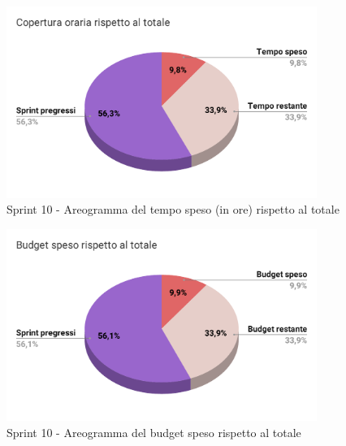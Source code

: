   \begin{figure}[H]
    \centering
    \includegraphics[width=0.90\textwidth]{assets/Consuntivo/Sprint-10/copertura_oraria.pdf}
    \caption{Sprint 10 - Areogramma del tempo speso (in ore) rispetto al totale}
  \end{figure}

  \begin{figure}[H]
    \centering
    \includegraphics[width=0.90\textwidth]{assets/Consuntivo/Sprint-10/budget_speso.pdf}
    \caption{Sprint 10 - Areogramma del budget speso rispetto al totale}
  \end{figure}

